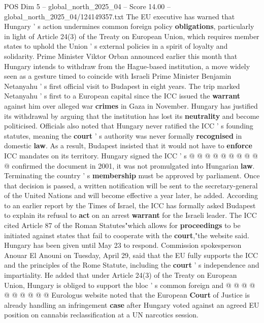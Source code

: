 \begin{textsample}{POS Dim 5 – global\_north\_2025\_04 – Score 14.00 – global\_north\_2025\_04/124149357.txt}  \label{ex:f5_pos_098}
The EU executive has warned that Hungary ' s action undermines common foreign policy \textbf{obligations}, particularly in light of Article 24(3) of the Treaty on European Union, which requires member states to uphold the Union ' s external policies in a spirit of loyalty and solidarity.
Prime Minister Viktor Orban announced earlier this month that Hungary intends to withdraw from the Hague-based institution, a move widely seen as a gesture timed to coincide with Israeli Prime Minister Benjamin Netanyahu ' s first official visit to Budapest in eight years.
The trip marked Netanyahu ' s first to a European capital since the ICC issued the \textbf{warrant} against him over alleged war \textbf{crimes} in Gaza in November.
Hungary has justified its withdrawal by arguing that the institution has lost its \textbf{neutrality} and become politicised.
Officials also noted that Hungary never ratified the ICC ' s founding statutes, meaning the \textbf{court} ' s authority was never formally \textbf{recognised} in domestic \textbf{law}.
As a result, Budapest insisted that it would not have to \textbf{enforce} ICC mandates on its territory.
Hungary signed the ICC ' s @ @ @ @ @ @ @ @ @ @ confirmed the document in 2001, it was not promulgated into Hungarian \textbf{law}.
Terminating the country ' s \textbf{membership} must be approved by parliament.
Once that decision is passed, a written notification will be sent to the secretary-general of the United Nations and will become effective a year later, he added.
According to an earlier report by the Times of Israel, the ICC has formally asked Budapest to explain its refusal to \textbf{act} on an arrest \textbf{warrant} for the Israeli leader.
The ICC cited Article 87 of the Roman Statutes"which allows for \textbf{proceedings} to be initiated against states that fail to cooperate with the \textbf{court},"the website said.
Hungary has been given until May 23 to respond.
Commission spokesperson Anouar El Anouni on Tuesday, April 29, said that the EU fully supports the ICC and the principles of the Rome Statute, including the \textbf{court} ' s independence and impartiality.
He added that under Article 24(3) of the Treaty on European Union, Hungary is obliged to support the bloc ' s common foreign and @ @ @ @ @ @ @ @ @ @ Eurologus website noted that the European \textbf{Court} of Justice is already handling an infringement \textbf{case} after Hungary voted against an agreed EU position on cannabis reclassification at a UN narcotics session.

\end{textsample}
